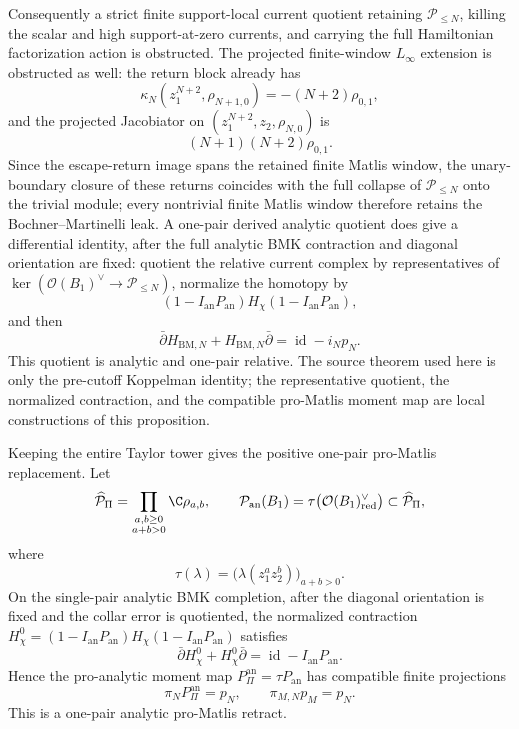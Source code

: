 \documentclass[11pt]{memoir}
\begin{document}
\begin{prop}
  Consequently a strict finite support-local current quotient retaining
  \(\mathcal P_{\le N}\), killing the scalar and high support-at-zero
  currents, and carrying the full Hamiltonian factorization action is
  obstructed.  The projected finite-window \(L_\infty\) extension
  is obstructed as well: the return block already has
  \[
    \kappa_N(z_1^{N+2},\rho_{N+1,0})=-(N+2)\rho_{0,1},
  \]
  and the projected Jacobiator on
  \((z_1^{N+2},z_2,\rho_{N,0})\) is
  \[
    (N+1)(N+2)\rho_{0,1}.
  \]
  Since the escape-return image spans the retained finite Matlis window,
  the unary-boundary closure of these returns coincides with the
  full collapse of \(\mathcal P_{\le N}\) onto the trivial module;
  every nontrivial finite Matlis window therefore retains the
  Bochner--Martinelli leak.  A one-pair derived analytic quotient
  does give a
  differential identity, after the full analytic BMK contraction and
  diagonal orientation are fixed: quotient the relative current complex
  by representatives of
  \(\ker(\mathcal O(B_1)^\vee\to\mathcal P_{\le N})\), normalize the
  homotopy by
  \[
    (1-I_{\mathrm{an}}P_{\mathrm{an}})H_\chi
    (1-I_{\mathrm{an}}P_{\mathrm{an}}),
  \]
  and then
  \[
    \bar\partial H_{\mathrm{BM},N}
    +H_{\mathrm{BM},N}\bar\partial
    =
    \operatorname{id}-i_Np_N .
  \]
  This quotient is analytic and one-pair relative.  The source theorem used
  here is only the pre-cutoff Koppelman identity; the representative
  quotient, the normalized contraction, and the compatible pro-Matlis
  moment map are local constructions of this proposition.

  Keeping the entire Taylor tower gives the positive one-pair
  pro-Matlis replacement.  Let
  \[
    \widehat{\mathcal P}_{\Pi}
      =
      \prod_{\substack{a,b\geq0\\a+b>0}}\C\rho_{a,b},
    \qquad
    \mathcal P_{\mathrm{an}}(B_1)
      =
      \tau\bigl(\mathcal O(B_1)^\vee_{\mathrm{red}}\bigr)
      \subset\widehat{\mathcal P}_{\Pi},
  \]
  where
  \[
    \tau(\lambda)
      =
      \bigl(\lambda(z_1^az_2^b)\bigr)_{a+b>0}.
  \]
  On the single-pair analytic BMK completion, after the diagonal orientation
  is fixed and the collar error is quotiented, the normalized contraction
  \(H_\chi^0=(1-I_{\mathrm{an}}P_{\mathrm{an}})
  H_\chi(1-I_{\mathrm{an}}P_{\mathrm{an}})\) satisfies
  \[
    \bar\partial H_\chi^0+H_\chi^0\bar\partial
    =
    \operatorname{id}-I_{\mathrm{an}}P_{\mathrm{an}}.
  \]
  Hence the pro-analytic moment map
  \(P_{\Pi}^{\mathrm{an}}=\tau P_{\mathrm{an}}\) has compatible finite
  projections
  \[
    \pi_NP_{\Pi}^{\mathrm{an}}=p_N,\qquad
    \pi_{M,N}p_M=p_N .
  \]
  This is a one-pair analytic pro-Matlis retract.


\end{prop}
\end{document}
